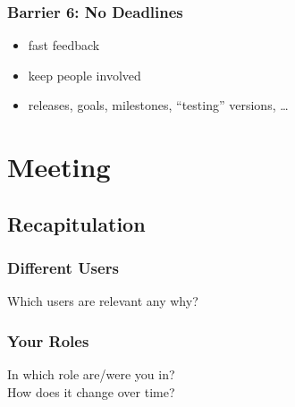 \begin{frame}
	\frametitle{Barrier 6: No Deadlines}

	\begin{itemize}[<+-| alert@+>]
	\item fast feedback
	\item keep people involved
	\item releases, goals, milestones, ``testing'' versions, \dots
	\end{itemize}
\end{frame}



\section{Meeting}

\subsection{Recapitulation}


\begin{frame}
	\frametitle{Different Users}

	Which users are relevant any why?
\end{frame}


\begin{frame}
	\frametitle{Your Roles}

	In which role are/were you in? \\
	How does it change over time?
\end{frame}

\breakframe

